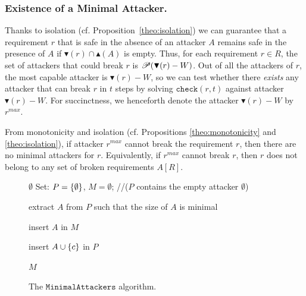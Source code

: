 {\subsubsection{Existence of a Minimal Attacker.} Thanks to isolation (cf. Proposition~\ref{theo:isolation}) we can guarantee that a requirement $r$ that is safe in the absence of an attacker $A$ remains safe in the presence of $A$ if $\blacktriangledown(r) \cap \blacktriangle(A)$ is empty. Thus, for each requirement $r\in R$, the set of attackers that could break $r$ is ${{\mathscr{P}}\!\left({\blacktriangledown(r)-W}\right)}$. Out of all the attackers of $r$, the most capable attacker is $\blacktriangledown(r)-W$, so we can test whether there \emph{exists} any attacker that can break $r$ in $t$ steps by solving $\mathtt{check}(r,t)$ against attacker $\blacktriangledown(r)-W$. 
For succinctness, we henceforth denote the attacker $\blacktriangledown(r)-W$ by $r^{max}$.
\begin{corollary}
From monotonicity and isolation (cf. Propositions \ref{theo:monotonicity} and \ref{theo:isolation}), if attacker $r^{max}$ cannot break the requirement $r$, then there are no minimal attackers for $r$. Equivalently, if $r^{max}$ cannot break $r$, then $r$ does not belong to any set of broken requirements $A[R]$.
\end{corollary}
\begin{figure}[!h]
\centering
{
\begin{framed}
\begin{algorithm}[H]
{
	{	
		\Return $\emptyset$\;
	}
}
Set: $P=\left\{\emptyset\right\}$, $M= \emptyset$; \quad /\!/($P$ contains the empty attacker $\emptyset$)\\
{
	extract $A$ from $P$ such that the size of $A$ is minimal\;
	{	
        	{
        		insert $A$ in $M$\;
        	}
        	{
        		 {
        			insert $A \cup \left\{c\right\}$ in $P$\;
        	 	}
        
        	}
	}
	
}
\Return $M$\;

 \caption{The $\mathtt{MinimalAttackers}$ algorithm.}
 \label{alg:CheckRequirement}
\end{algorithm}
\end{framed}}
\vspace{-0.5cm}
\end{figure}
}
